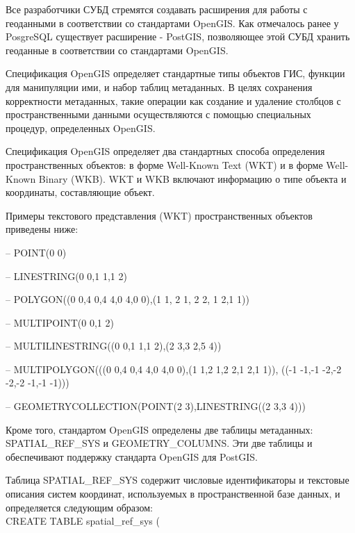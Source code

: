 \documentclass[12pt,a4paper,oneside]{article} %
\begin{document}
Все разработчики СУБД стремятся создавать расширения для работы \linebreak
с геоданными в соответствии со стандартами OpenGIS. Как отмечалось \linebreak
ранее у PosgreSQL существует расширение - PostGIS, позволяющее \linebreak
этой СУБД хранить геоданные в соответствии со стандартами OpenGIS.

Спецификация OpenGIS определяет стандартные типы объектов ГИС, \linebreak
функции для манипуляции ими, и набор таблиц метаданных. В целях \linebreak
сохранения корректности метаданных, такие операции как создание \linebreak
и удаление столбцов с пространственными данными осуществляются \linebreak
с помощью специальных процедур, определенных OpenGIS.

Спецификация OpenGIS определяет два стандартных способа \linebreak
определения пространственных объектов: в форме Well-Known Text \linebreak
(WKT) и в форме Well-Known Binary (WKB). WKT и WKB включают \linebreak
информацию о типе объекта и координаты, составляющие объект.

Примеры текстового представления (WKT) пространственных \linebreak
объектов приведены ниже:

-- POINT(0 0)

-- LINESTRING(0 0,1 1,1 2)

-- POLYGON((0 0,4 0,4 4,0 4,0 0),(1 1, 2 1, 2 2, 1 2,1 1))

-- MULTIPOINT(0 0,1 2)

-- MULTILINESTRING((0 0,1 1,1 2),(2 3,3 2,5 4))

-- MULTIPOLYGON(((0 0,4 0,4 4,0 4,0 0),(1 1,2 1,2 2,1 2,1 1)), \linebreak
((-1 -1,-1 -2,-2 -2,-2 -1,-1 -1)))

-- GEOMETRYCOLLECTION(POINT(2 3),LINESTRING((2 3,3 4)))

Кроме того, стандартом OpenGIS определены две таблицы метаданных: \linebreak
SPATIAL\_REF\_SYS и GEOMETRY\_COLUMNS. Эти две таблицы и \linebreak
обеспечивают поддержку стандарта OpenGIS для PostGIS.

Таблица SPATIAL\_REF\_SYS содержит числовые идентификаторы и \linebreak
текстовые описания систем координат, используемых в \linebreak
пространственной базе данных, и определяется следующим образом:
\\[10pt]
CREATE TABLE spatial\_ref\_sys (
\end{document}
